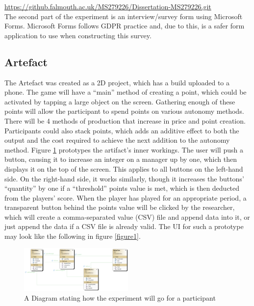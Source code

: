 \documentclass[conference]{IEEEtran}
\begin{document}
\url{https://github.falmouth.ac.uk/MS279226/Dissertation-MS279226.git}\\

The second part of the experiment is an interview/survey form using Microsoft Forms. Microsoft Forms follows GDPR practice and, due to this, is a safer form application to use when constructing this survey.

\subsection{Artefact}
The Artefact was created as a 2D project, which has a build uploaded to a phone. The game will have a “main” method of creating a point, which could be activated by tapping a large object on the screen. Gathering enough of these points will allow the participant to spend points on various autonomy methods. There will be 4 methods of production that increase in price and point creation. Participants could also stack points, which adds an additive effect to both the output and the cost required to achieve the next addition to the autonomy method. Figure \ref{figure3} prototypes the artifact’s inner workings. The user will push a button, causing it to increase an integer on a manager up by one, which then displays it on the top of the screen. This applies to all buttons on the left-hand side. On the right-hand side, it works similarly, though it increases the buttons' “quantity” by one if a “threshold” points value is met, which is then deducted from the players’ score. When the player has played for an appropriate period, a transparent button behind the points value will be clicked by the researcher, which will create a comma-separated value (CSV) file and append data into it, or just append the data if a CSV file is already valid. The UI for such a prototype may look like the following in figure \ref{figure1}.
\\

\begin{figure}[H]
\includegraphics[width = 0.5\textwidth]{UMLProcess}
\caption{A Diagram stating how the experiment will go for a participant}
\label{figure3}
\end{figure}
\end{document}
